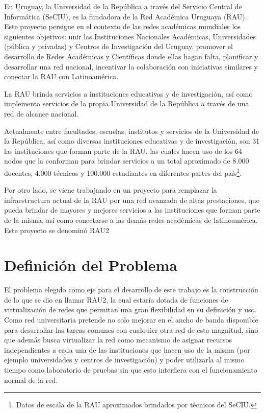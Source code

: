 En Uruguay, la Universidad de la República a través del Servicio Central de Informática (SeCIU), es la fundadora de la Red Académica Uruguaya (RAU). Este proyecto persigue en el contexto de las redes académicas mundiales los siguientes objetivos: unir las Instituciones Nacionales Académicas, Universidades (pública y privadas) y Centros de Investigación del Uruguay, promover el desarrollo de Redes Académicas y Científicas donde ellas hagan falta, planificar y desarrollar una red nacional, incentivar la colaboración con iniciativas similares y conectar la RAU con Latinoamérica. 

La RAU brinda servicios a instituciones educativas y de investigación, as\'i como implementa servicios de la propia Universidad de la República a trav\'es de una red de alcance nacional.

Actualmente entre facultades, escuelas, institutos y servicios de la Universidad de la República, así como diversas instituciones educativas y de investigación, son 31 las instituciones que forman parte de la RAU, las cuales hacen uso de los 64 nodos que la conforman para brindar servicios a un total aproximado de 8.000 docentes, 4.000 técnicos y 100.000 estudiantes en diferentes partes del país\footnote{Datos de escala de la RAU aproximados brindados por t\'ecnicos del SeCIU.}.

Por otro lado, se viene trabajando en un proyecto para remplazar la infraestructura actual de la RAU por una red avanzada de altas prestaciones, que pueda brindar de mayores y mejores servicios a las instituciones que forman parte de la misma, así como conectarse a las demás redes académicas de latinoam\'erica. Este proyecto se denomin\'o RAU2  

\section{Definición del Problema}

El problema elegido como eje para el desarrollo de este trabajo es la 
construcción de lo que se dio en llamar RAU2, la cual estaría dotada de funciones de virtualización de redes que permitan una gran flexibilidad en su definición y uso. Como red universitaria pretende no solo mejorar en el ancho de banda disponible para desarrollar las tareas comunes con cualquier otra red de esta magnitud, sino que además busca virtualizar la red como mecanismo de asignar recursos independientes a cada una de las instituciones que hacen uso de la misma (por ejemplo universidades y centros de investigación) y poder utilizarla al mismo tiempo como laboratorio de pruebas sin que esto interfiera con el funcionamiento normal de la red.\\

